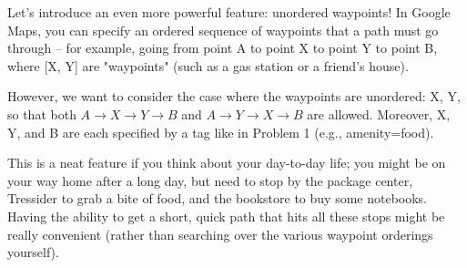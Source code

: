 \documentclass{article}
\theoremstyle{case}
\theoremstyle{definition}
\begin{document}
  Let's introduce an even more powerful feature: unordered waypoints! In Google Maps, you can specify an ordered
  sequence of waypoints that a path must go through – for example, going from point A to point X to point Y to point B,
  where [X, Y] are "waypoints" (such as a gas station or a friend's house).


  However, we want to consider the case where the waypoints are unordered: {X, Y}, so that both $A \rightarrow X \rightarrow Y \rightarrow B$
  and $A \rightarrow Y \rightarrow X \rightarrow B$ are allowed. Moreover, X, Y, and B are each specified by a tag like in Problem 1 (e.g.,
  amenity=food).


  This is a neat feature if you think about your day-to-day life; you might be on your way home after a long day, but
  need to stop by the package center, Tressider to grab a bite of food, and the bookstore to buy some notebooks. Having
  the ability to get a short, quick path that hits all these stops might be really convenient (rather than searching
  over the various waypoint orderings yourself).
\end{document}
